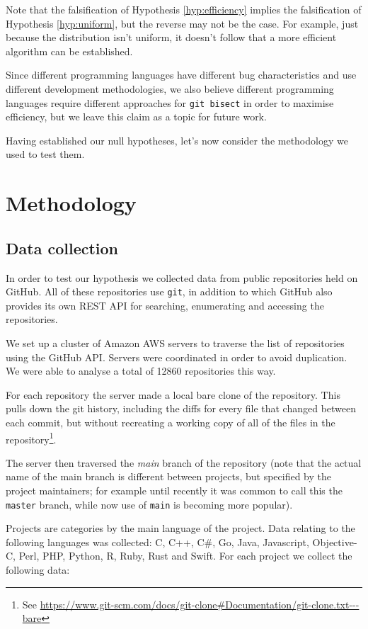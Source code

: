 \documentclass[pdflatex, sn-mathphys, referee]{sn-jnl}%
\theoremstyle{thmstyleone}%
\theoremstyle{thmstyletwo}%
\theoremstyle{thmstylethree}%
\def\code{\tt}
\theoremstyle{thmstyleone}
\begin{document}
Note that the falsification of Hypothesis \ref{hyp:efficiency} implies the falsification of Hypothesis \ref{hyp:uniform}, but the reverse may not be the case. For example, just because the distribution isn't uniform, it doesn't follow that a more efficient algorithm can be established.

Since different programming languages have different bug characteristics \cite{nanz2015} and use different development methodologies, we also believe different programming languages require different approaches for {\code git bisect} in order to maximise efficiency, but we leave this claim as a topic for future work.

Having established our null hypotheses, let's now consider the methodology we used to test them.

\section{Methodology}

\subsection{Data collection}

In order to test our hypothesis we collected data from public repositories held on GitHub. All of these repositories use {\code git}, in addition to which GitHub also provides its own REST API for searching, enumerating and accessing the repositories.

We set up a cluster of Amazon AWS servers to traverse the list of repositories using the GitHub API. Servers were coordinated in order to avoid duplication. We were able to analyse a total of 12860 repositories this way.

For each repository the server made a local bare clone of the repository. This pulls down the git history, including the diffs for every file that changed between each commit, but without recreating a working copy of all of the files in the repository\footnote{See \url{https://www.git-scm.com/docs/git-clone\#Documentation/git-clone.txt---bare}}.

The server then traversed the {\it main\/} branch of the repository (note that the actual name of the main branch is different between projects, but specified by the project maintainers; for example until recently it was common to call this the {\code master} branch, while now use of {\code main} is becoming more popular).

Projects are categories by the main language of the project. Data relating to the following languages was collected: C, C++, C\#, Go, Java, Javascript, Objective-C, Perl, PHP, Python, R, Ruby, Rust and Swift. For each project we collect the following data:
\end{document}
